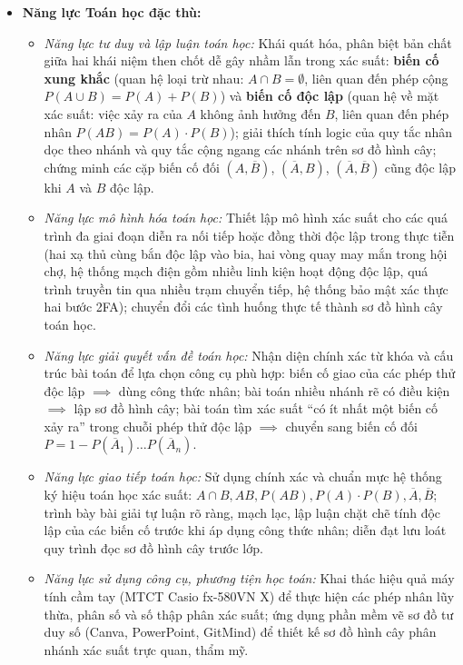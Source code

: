 \documentclass[12pt, a4paper]{article}
\begin{document}
\begin{itemize}[leftmargin=1.2cm]
    \item \textbf{Năng lực Toán học đặc thù:}
    \begin{itemize}[leftmargin=0.6cm]
        \item \textit{Năng lực tư duy và lập luận toán học:} Khái quát hóa, phân biệt bản chất giữa hai khái niệm then chốt dễ gây nhầm lẫn trong xác suất: \textbf{biến cố xung khắc} (quan hệ loại trừ nhau: $A \cap B = \emptyset$, liên quan đến phép cộng $P(A \cup B) = P(A) + P(B)$) và \textbf{biến cố độc lập} (quan hệ về mặt xác suất: việc xảy ra của $A$ không ảnh hưởng đến $B$, liên quan đến phép nhân $P(AB) = P(A) \cdot P(B)$); giải thích tính logic của quy tắc nhân dọc theo nhánh và quy tắc cộng ngang các nhánh trên sơ đồ hình cây; chứng minh các cặp biến cố đối $(A, \overline{B})$, $(\overline{A}, B)$, $(\overline{A}, \overline{B})$ cũng độc lập khi $A$ và $B$ độc lập.
        \item \textit{Năng lực mô hình hóa toán học:} Thiết lập mô hình xác suất cho các quá trình đa giai đoạn diễn ra nối tiếp hoặc đồng thời độc lập trong thực tiễn (hai xạ thủ cùng bắn độc lập vào bia, hai vòng quay may mắn trong hội chợ, hệ thống mạch điện gồm nhiều linh kiện hoạt động độc lập, quá trình truyền tin qua nhiều trạm chuyển tiếp, hệ thống bảo mật xác thực hai bước 2FA); chuyển đổi các tình huống thực tế thành sơ đồ hình cây toán học.
        \item \textit{Năng lực giải quyết vấn đề toán học:} Nhận diện chính xác từ khóa và cấu trúc bài toán để lựa chọn công cụ phù hợp: biến cố giao của các phép thử độc lập $\implies$ dùng công thức nhân; bài toán nhiều nhánh rẽ có điều kiện $\implies$ lập sơ đồ hình cây; bài toán tìm xác suất ``có ít nhất một biến cố xảy ra'' trong chuỗi phép thử độc lập $\implies$ chuyển sang biến cố đối $P = 1 - P(\overline{A}_1)\dots P(\overline{A}_n)$.
        \item \textit{Năng lực giao tiếp toán học:} Sử dụng chính xác và chuẩn mực hệ thống ký hiệu toán học xác suất: $A \cap B, AB, P(AB), P(A) \cdot P(B), \overline{A}, \overline{B}$; trình bày bài giải tự luận rõ ràng, mạch lạc, lập luận chặt chẽ tính độc lập của các biến cố trước khi áp dụng công thức nhân; diễn đạt lưu loát quy trình đọc sơ đồ hình cây trước lớp.
        \item \textit{Năng lực sử dụng công cụ, phương tiện học toán:} Khai thác hiệu quả máy tính cầm tay (MTCT Casio fx-580VN X) để thực hiện các phép nhân lũy thừa, phân số và số thập phân xác suất; ứng dụng phần mềm vẽ sơ đồ tư duy số (Canva, PowerPoint, GitMind) để thiết kế sơ đồ hình cây phân nhánh xác suất trực quan, thẩm mỹ.
    \end{itemize}


\end{itemize}
\end{document}
